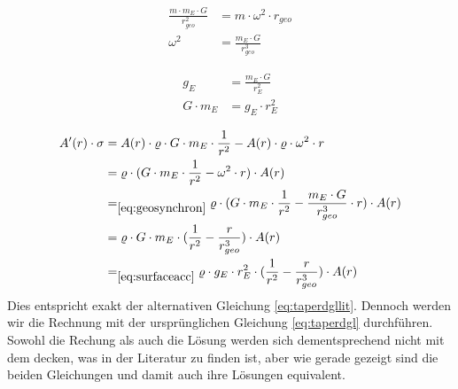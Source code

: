 \documentclass[a4paper, 10pt]{report}
\begin{document}
\begin{align}
\frac{m \cdot m_E \cdot G}{r_{geo}^2} &= m \cdot \omega^2 \cdot r_{geo}\nonumber \\
\omega^2 &= \frac{m_E \cdot G}{r_{geo}^3}
\label{eq:geosynchron}
\end{align}

\begin{align}
g_E &= \frac{m_E \cdot G}{r_E^2} \nonumber \\
G \cdot m_E &= g_E \cdot r_E^2
\label{eq:surfaceacc}
\end{align}

\begin{align*}
A'(r) \cdot \sigma &= A(r) \cdot \varrho \cdot G \cdot m_E \cdot \frac{1}{r^2} - A(r) \cdot \varrho \cdot \omega^2 \cdot r\\
&= \varrho \cdot (G \cdot m_E \cdot \frac{1}{r^2} - \omega^2 \cdot r) \cdot A(r)\\
&=_{\ref{eq:geosynchron}} \varrho \cdot (G \cdot m_E \cdot \frac{1}{r^2} - \frac{m_E \cdot G}{r_{geo}^3} \cdot r) \cdot A(r)\\
&= \varrho \cdot G \cdot m_E \cdot (\frac{1}{r^2} - \frac{r}{r_{geo}^3}) \cdot A(r)\\
&=_{\ref{eq:surfaceacc}} \varrho \cdot g_E \cdot r_E^2 \cdot (\frac{1}{r^2} - \frac{r}{r_{geo}^3}) \cdot A(r)\\
\end{align*}
Dies entspricht exakt der alternativen Gleichung \ref{eq:taperdgllit}. Dennoch werden wir die Rechnung mit der ursprünglichen Gleichung \ref{eq:taperdgl} durchführen. Sowohl die Rechung als auch die Lösung werden sich dementsprechend nicht mit dem decken, was in der Literatur zu finden ist, aber wie gerade gezeigt sind die beiden Gleichungen und damit auch ihre Lösungen equivalent.
\end{document}
